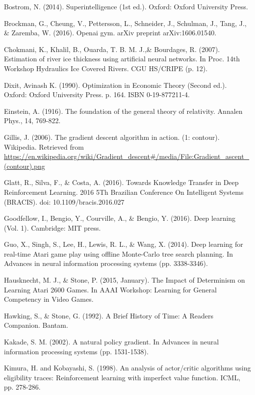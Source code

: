 \begin{thebibliography}{99}
\bibitem{} Bostrom, N. (2014). Superintelligence (1st ed.). Oxford: Oxford University Press.

\bibitem{} Brockman, G., Cheung, V., Pettersson, L., Schneider, J., Schulman, J., Tang, J., \&
Zaremba, W. (2016). Openai gym. arXiv preprint arXiv:1606.01540.

\bibitem{} Chokmani, K., Khalil, B., Ouarda, T. B. M. J.,\& Bourdages, R. (2007). Estimation of river ice
thickness using artificial neural networks. In Proc. 14th Workshop Hydraulics Ice Covered Rivers. CGU HS/CRIPE (p. 12).

\bibitem{} Dixit, Avinash K. (1990). Optimization in Economic Theory (Second ed.). Oxford: Oxford University Press. p. 164. ISBN 0-19-877211-4.

\bibitem{} Einstein, A. (1916). The foundation of the general theory of relativity. Annalen Phys., 14, 769-822.

\bibitem{} Gillis, J. (2006). The gradient descent algorithm in action. (1: contour). Wikipedia. Retrieved
from \url{https://en.wikipedia.org/wiki/Gradient\_descent\#/media/File:Gradient\_ascent\_(contour).png}

\bibitem{} Glatt, R., Silva, F., \& Costa, A. (2016). Towards Knowledge Transfer in Deep Reinforcement Learning. 2016 5Th Brazilian Conference On Intelligent Systems (BRACIS). doi: 10.1109/bracis.2016.027

\bibitem{} Goodfellow, I., Bengio, Y., Courville, A., \& Bengio, Y. (2016). Deep learning (Vol. 1).
Cambridge: MIT press.

\bibitem{} Guo, X., Singh, S., Lee, H., Lewis, R. L., \& Wang, X. (2014). Deep learning for real-time Atari game play using offline Monte-Carlo tree search planning. In Advances in neural information processing systems (pp. 3338-3346).

\bibitem{} Hausknecht, M. J., \& Stone, P. (2015, January). The Impact of Determinism on Learning
Atari 2600 Games. In AAAI Workshop: Learning for General Competency in Video Games.

\bibitem{} Hawking, S., \& Stone, G. (1992). A Brief History of Time: A Readers Companion. Bantam.

\bibitem{} Kakade, S. M. (2002). A natural policy gradient. In Advances in neural information processing systems (pp. 1531-1538).

\bibitem{} Kimura, H. and Kobayashi, S. (1998). An analysis of actor/critic algorithms using eligibility traces:
Reinforcement learning with imperfect value function. ICML, pp. 278-286.


\end{thebibliography}
